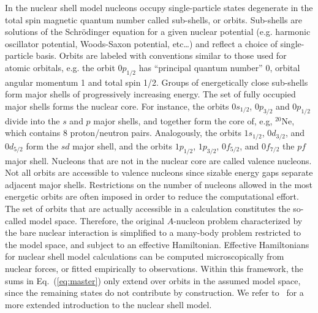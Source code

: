 \documentclass[11pt,a4paper]{article}
\begin{document}
In the nuclear shell model nucleons occupy single-particle states degenerate in the total spin magnetic quantum number called sub-shells, or orbits. Sub-shells are solutions of the Schr\"odinger equation for a given nuclear potential (e.g. harmonic oscillator potential, Woods-Saxon potential, etc\dots) and reflect a choice of single-particle basis. Orbits are labeled with conventions similar to those used for atomic orbitals, e.g. the orbit $0p_{1/2}$ has ``principal quantum number'' 0, orbital angular momentum 1 and total spin 1/2. Groups of energetically close sub-shells form major shells of progressively increasing energy. The set of fully occupied major shells forms the nuclear core. For instance, the orbits $0s_{1/2}$, $0p_{3/2}$ and $0p_{1/2}$ divide into the $s$ and $p$ major shells, and together form the core of, e.g, $^{20}$Ne, which contains 8 proton/neutron pairs. Analogously, the orbits $1s_{1/2}$, $0d_{3/2}$, and $0d_{5/2}$ form the $sd$ major shell, and the orbits $1p_{1/2}$, $1p_{3/2}$, $0f_{5/2}$, and $0f_{7/2}$ the $pf$ major shell. Nucleons that are not in the nuclear core are called valence nucleons. Not all orbits are accessible to valence nucleons since sizable energy gaps separate adjacent major shells. 
Restrictions on the number of nucleons allowed in the most energetic orbits are often imposed in order to reduce the computational effort. 
The set of orbits that are actually accessible in a calculation constitutes the so-called model space. 
Therefore, the original $A$-nucleon problem characterized by the bare nuclear interaction is simplified to a many-body problem restricted to the model space, and subject to an effective Hamiltonian. Effective Hamiltonians for nuclear shell model calculations can be computed microscopically from nuclear forces, or fitted empirically to observations.
Within this framework, the sums in Eq.~(\ref{eq:master}) only extend over orbits in the assumed model space, since the remaining states do not contribute by construction. We refer to~\cite{Brown:2001zz,Caurier:2004gf} for a more extended introduction to the nuclear shell model.
\end{document}
